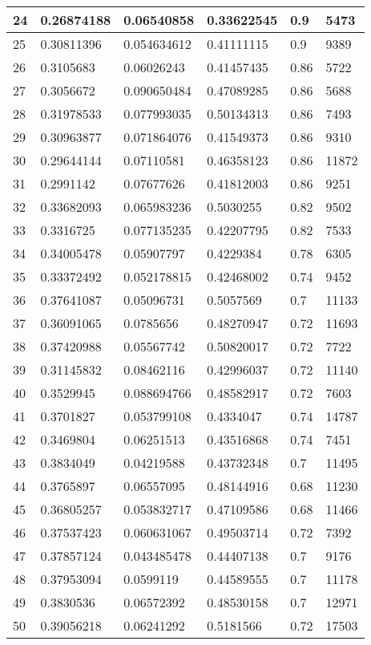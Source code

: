 \begin{longtable}{|l|l|l|l|l|l|}
24 & 0.26874188 & 0.06540858 & 0.33622545 & 0.9 & 5473 \\ \hline 
25 & 0.30811396 & 0.054634612 & 0.41111115 & 0.9 & 9389 \\ \hline 
26 & 0.3105683 & 0.06026243 & 0.41457435 & 0.86 & 5722 \\ \hline 
27 & 0.3056672 & 0.090650484 & 0.47089285 & 0.86 & 5688 \\ \hline 
28 & 0.31978533 & 0.077993035 & 0.50134313 & 0.86 & 7493 \\ \hline 
29 & 0.30963877 & 0.071864076 & 0.41549373 & 0.86 & 9310 \\ \hline 
30 & 0.29644144 & 0.07110581 & 0.46358123 & 0.86 & 11872 \\ \hline 
31 & 0.2991142 & 0.07677626 & 0.41812003 & 0.86 & 9251 \\ \hline 
32 & 0.33682093 & 0.065983236 & 0.5030255 & 0.82 & 9502 \\ \hline 
33 & 0.3316725 & 0.077135235 & 0.42207795 & 0.82 & 7533 \\ \hline 
34 & 0.34005478 & 0.05907797 & 0.4229384 & 0.78 & 6305 \\ \hline 
35 & 0.33372492 & 0.052178815 & 0.42468002 & 0.74 & 9452 \\ \hline 
36 & 0.37641087 & 0.05096731 & 0.5057569 & 0.7 & 11133 \\ \hline 
37 & 0.36091065 & 0.0785656 & 0.48270947 & 0.72 & 11693 \\ \hline 
38 & 0.37420988 & 0.05567742 & 0.50820017 & 0.72 & 7722 \\ \hline 
39 & 0.31145832 & 0.08462116 & 0.42996037 & 0.72 & 11140 \\ \hline 
40 & 0.3529945 & 0.088694766 & 0.48582917 & 0.72 & 7603 \\ \hline 
41 & 0.3701827 & 0.053799108 & 0.4334047 & 0.74 & 14787 \\ \hline 
42 & 0.3469804 & 0.06251513 & 0.43516868 & 0.74 & 7451 \\ \hline 
43 & 0.3834049 & 0.04219588 & 0.43732348 & 0.7 & 11495 \\ \hline 
44 & 0.3765897 & 0.06557095 & 0.48144916 & 0.68 & 11230 \\ \hline 
45 & 0.36805257 & 0.053832717 & 0.47109586 & 0.68 & 11466 \\ \hline 
46 & 0.37537423 & 0.060631067 & 0.49503714 & 0.72 & 7392 \\ \hline 
47 & 0.37857124 & 0.043485478 & 0.44407138 & 0.7 & 9176 \\ \hline 
48 & 0.37953094 & 0.0599119 & 0.44589555 & 0.7 & 11178 \\ \hline 
49 & 0.3830536 & 0.06572392 & 0.48530158 & 0.7 & 12971 \\ \hline 
50 & 0.39056218 & 0.06241292 & 0.5181566 & 0.72 & 17503 \\ \hline 
\end{longtable}